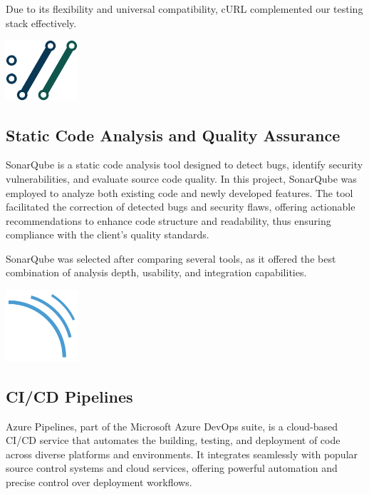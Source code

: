 Due to its flexibility and universal compatibility, cURL complemented our testing stack effectively.

\begin{center}
    \centering
    \includegraphics[width=0.2\textwidth]{Images/cURL Logo.png}
     \cite{curl_logo}
    \label{fig:curl_logo}
\end{center}

\subsection{Static Code Analysis and Quality Assurance}
SonarQube is a static code analysis tool designed to detect bugs, identify security vulnerabilities, and evaluate source code quality. In this project, SonarQube was employed to analyze both existing code and newly developed features. The tool facilitated the correction of detected bugs and security flaws, offering actionable recommendations to enhance code structure and readability, thus ensuring compliance with the client's quality standards.\mynewline

SonarQube was selected after comparing several tools, as it offered the best combination of analysis depth, usability, and integration capabilities.

\begin{center}
    \centering
    \includegraphics[width=0.2\textwidth]{Images/SonarQube Logo.png}
     \cite{sonarqube_logo}
    \label{fig:sonarqube_logo}
\end{center}

\subsection{CI/CD Pipelines}
Azure Pipelines, part of the Microsoft Azure DevOps suite, is a cloud-based CI/CD service that automates the building, testing, and deployment of code across diverse platforms and environments. It integrates seamlessly with popular source control systems and cloud services, offering powerful automation and precise control over deployment workflows.\mynewline

